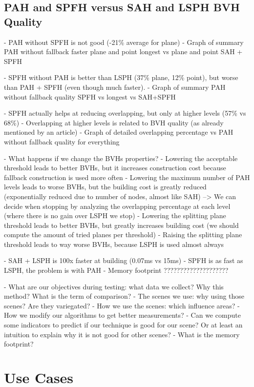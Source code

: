 \documentclass{PoliMi_MasterThesis}
\begin{document}
\section{PAH and SPFH versus SAH and LSPH BVH Quality}
- PAH without SPFH is not good (-21\% average for plane)
	- Graph of summary PAH without fallback faster plane and point longest vs plane and point SAH + SPFH

- SPFH without PAH is better than LSPH (37\% plane, 12\% point), but worse than PAH + SPFH (even though much faster).
	- Graph of summary PAH without fallback quality SPFH vs longest vs SAH+SPFH

- SPFH actually helps at reducing overlapping, but only at higher levels (57\% vs 68\%)
- Overlapping at higher levels is related to BVH quality (as already mentioned by an article)
	- Graph of detailed overlapping percentage vs PAH without fallback quality for everything

- What happens if we change the BVHs properties?
	- Lowering the acceptable threshold leads to better BVHs, but it increases construction cost because fallback construction is used more often
	- Lowering the maximum number of PAH levels leads to worse BVHs, but the building cost is greatly reduced (exponentially reduced due to number of nodes, almost like SAH) --> We can decide when stopping by analyzing the overlapping percentage at each level (where there is no gain over LSPH we stop)
	- Lowering the splitting plane threshold leads to better BVHs, but greatly increases building cost (we should compute the amount of tried planes per threshold)
	- Raising the splitting plane threshold leads to way worse BVHs, because LSPH is used almost always


- SAH + LSPH is 100x faster at building (0.07ms vs 15ms)
- SPFH is as fast as LSPH, the problem is with PAH
- Memory footprint ????????????????????


- What are our objectives during testing: what data we collect? Why this method? What is the term of comparison?
- The scenes we use: why using those scenes? Are they variegated?
- How we use the scenes: which influence areas?
- How we modify our algorithms to get better measurements?
- Can we compute some indicators to predict if our technique is good for our scene? Or at least an intuition to explain why it is not good for other scenes?
- What is the memory footprint?

\chapter{Use Cases} \label{ch:use_cases}
\end{document}
